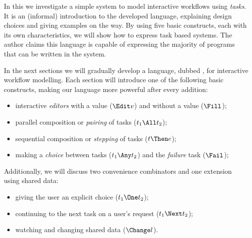 
In this we investigate a simple system to model interactive workflows using \emph{tasks}.
It is an (informal) introduction to the developed language,
explaining design choices and giving examples on the way.
By using five basic constructs,
each with its own characteristics,
we will show how to express task based systems.
The author claims this language is capable of expressing the majority of programs that can be written in the \ITASKS \cite{plasmeijer2011itasks} system.

In the next sections we will gradually develop a language, dubbed \Lang, for interactive workflow modelling.
Each section will introduce one of the following basic constructs,
making our language more powerful after every addition:
\begin{itemize}
  \item interactive \emph{editors} with a value ($\Edit v$) and without a value ($\Fill$);
  \item parallel composition or \emph{pairing} of tasks ($t_1 \All t_2$);
  \item sequential composition or \emph{stepping} of tasks ($t \Then e$);
  \item making a \emph{choice} between tasks ($t_1 \Any t_2$) and the \emph{failure} task ($\Fail$);
\end{itemize}
Additionally, we will discuss two convenience combinators and one extension using shared data:
\begin{itemize}
  \item giving the user an explicit choice ($t_1 \One t_2$);
  \item continuing to the next task on a user's request ($t_1 \Next t_2$);
  \item watching and changing shared data ($\Change l$).
\end{itemize}

